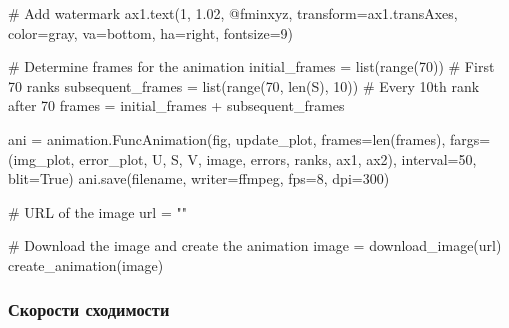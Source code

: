 \documentclass[
  russian,
  letterpaper,
  DIV=11,
  numbers=noendperiod]{scrartcl}
\newenvironment{Shaded}{\begin{snugshade}}{\end{snugshade}}
\newcommand{\BuiltInTok}[1]{\textcolor[rgb]{0.00,0.23,0.31}{#1}}
\newcommand{\CommentTok}[1]{\textcolor[rgb]{0.37,0.37,0.37}{#1}}
\newcommand{\DecValTok}[1]{\textcolor[rgb]{0.68,0.00,0.00}{#1}}
\newcommand{\FloatTok}[1]{\textcolor[rgb]{0.68,0.00,0.00}{#1}}
\newcommand{\NormalTok}[1]{\textcolor[rgb]{0.00,0.23,0.31}{#1}}
\newcommand{\OperatorTok}[1]{\textcolor[rgb]{0.37,0.37,0.37}{#1}}
\newcommand{\StringTok}[1]{\textcolor[rgb]{0.13,0.47,0.30}{#1}}
\newcommand{\VariableTok}[1]{\textcolor[rgb]{0.07,0.07,0.07}{#1}}
\begin{document}
\begin{enumerate}
\begin{Shaded}
\begin{Highlighting}[]
    \CommentTok{\# Add watermark}
\NormalTok{    ax1.text(}\DecValTok{1}\NormalTok{, }\FloatTok{1.02}\NormalTok{, }\StringTok{\textquotesingle{}@fminxyz\textquotesingle{}}\NormalTok{, transform}\OperatorTok{=}\NormalTok{ax1.transAxes, color}\OperatorTok{=}\StringTok{\textquotesingle{}gray\textquotesingle{}}\NormalTok{, va}\OperatorTok{=}\StringTok{\textquotesingle{}bottom\textquotesingle{}}\NormalTok{, ha}\OperatorTok{=}\StringTok{\textquotesingle{}right\textquotesingle{}}\NormalTok{, fontsize}\OperatorTok{=}\DecValTok{9}\NormalTok{)}

    \CommentTok{\# Determine frames for the animation}
\NormalTok{    initial\_frames }\OperatorTok{=} \BuiltInTok{list}\NormalTok{(}\BuiltInTok{range}\NormalTok{(}\DecValTok{70}\NormalTok{))  }\CommentTok{\# First 70 ranks}
\NormalTok{    subsequent\_frames }\OperatorTok{=} \BuiltInTok{list}\NormalTok{(}\BuiltInTok{range}\NormalTok{(}\DecValTok{70}\NormalTok{, }\BuiltInTok{len}\NormalTok{(S), }\DecValTok{10}\NormalTok{))  }\CommentTok{\# Every 10th rank after 70}
\NormalTok{    frames }\OperatorTok{=}\NormalTok{ initial\_frames }\OperatorTok{+}\NormalTok{ subsequent\_frames}

\NormalTok{    ani }\OperatorTok{=}\NormalTok{ animation.FuncAnimation(fig, update\_plot, frames}\OperatorTok{=}\BuiltInTok{len}\NormalTok{(frames), fargs}\OperatorTok{=}\NormalTok{(img\_plot, error\_plot, U, S, V, image, errors, ranks, ax1, ax2), interval}\OperatorTok{=}\DecValTok{50}\NormalTok{, blit}\OperatorTok{=}\VariableTok{True}\NormalTok{)}
\NormalTok{    ani.save(filename, writer}\OperatorTok{=}\StringTok{\textquotesingle{}ffmpeg\textquotesingle{}}\NormalTok{, fps}\OperatorTok{=}\DecValTok{8}\NormalTok{, dpi}\OperatorTok{=}\DecValTok{300}\NormalTok{)}

    \CommentTok{\# URL of the image}
\NormalTok{    url }\OperatorTok{=} \StringTok{""}

    \CommentTok{\# Download the image and create the animation}
\NormalTok{    image }\OperatorTok{=}\NormalTok{ download\_image(url)}
\NormalTok{    create\_animation(image)}
\end{Highlighting}
\end{Shaded}
\end{enumerate}

\subsubsection{Скорости
сходимости}\label{ux441ux43aux43eux440ux43eux441ux442ux438-ux441ux445ux43eux434ux438ux43cux43eux441ux442ux438-1}
\end{document}
